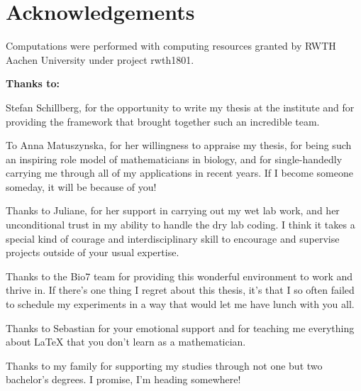 \section*{Acknowledgements}

Computations were performed with computing resources granted by RWTH Aachen University under project rwth1801.

\vspace{0.5cm}

\noindent \textbf{Thanks to:}

Stefan Schillberg, for the opportunity to write my thesis at the institute and for providing the framework that brought together such an incredible team.

\vspace{0.3cm}

To Anna Matuszynska, for her willingness to appraise my thesis, for being such an inspiring role model of mathematicians in biology, and for single-handedly carrying me through all of my applications in recent years. If I become someone someday, it will be because of you!

\vspace{0.3cm}

Thanks to Juliane, for her support in carrying out my wet lab work, and her unconditional trust in my ability to handle the dry lab coding. I think it takes a special kind of courage and interdisciplinary skill to encourage and supervise projects outside of your usual expertise.

\vspace{0.3cm}

Thanks to the Bio7 team for providing this wonderful environment to work and thrive in. If there's one thing I regret about this thesis, it's that I so often failed to schedule my experiments in a way that would let me have lunch with you all.

\vspace{0.3cm}

Thanks to Sebastian for your emotional support and for teaching me everything about \LaTeX{} that you don't learn as a mathematician.

\vspace{0.3cm}

Thanks to my family for supporting my studies through not one but two bachelor's degrees. I promise, I'm heading somewhere!
